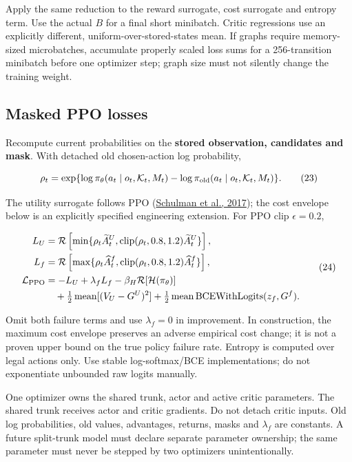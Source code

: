 \documentclass[10pt,a4paper]{article}
\begin{document}
Apply the same reduction to the reward surrogate, cost surrogate and
entropy term. Use the actual \(B\) for a final short minibatch. Critic
regressions use an explicitly different, uniform-over-stored-states
mean. If graphs require memory-sized microbatches, accumulate properly
scaled loss sums for a 256-transition minibatch before one optimizer
step; graph size must not silently change the training weight.

\hypertarget{masked-ppo-losses}{%
\subsection{Masked PPO losses}\label{masked-ppo-losses}}

Recompute current probabilities on the \textbf{stored observation,
candidates and mask}. With detached old chosen-action log probability,

\[
\rho_t=\exp\{\log\pi_\theta(a_t\mid o_t,\mathcal K_t,M_t)
-\log\pi_{\rm old}(a_t\mid o_t,\mathcal K_t,M_t)\}.
\tag{23}
\]

The utility surrogate follows PPO
(\href{https://arxiv.org/abs/1707.06347}{Schulman et al., 2017}); the
cost envelope below is an explicitly specified engineering extension.
For PPO clip \(\epsilon=0.2\),

\[
\begin{aligned}
L_U&=\mathcal R\left[\min\{\rho_t\widetilde A_t^U,
\operatorname{clip}(\rho_t,0.8,1.2)\widetilde A_t^U\}\right],\\
L_f&=\mathcal R\left[\max\{\rho_t\widehat A_t^f,
\operatorname{clip}(\rho_t,0.8,1.2)\widehat A_t^f\}\right],\\
\mathcal L_{\rm PPO}&=-L_U+\lambda_fL_f-\beta_H\mathcal R[\mathcal H(\pi_\theta)]\\
&\quad+\tfrac12\operatorname{mean}[(V_U-G^U)^2]
+\tfrac12\operatorname{mean}\operatorname{BCEWithLogits}(z_f,G^f).
\end{aligned}
\tag{24}
\]

Omit both failure terms and use \(\lambda_f=0\) in improvement. In
construction, the maximum cost envelope preserves an adverse empirical
cost change; it is not a proven upper bound on the true policy failure
rate. Entropy is computed over legal actions only. Use stable
log-softmax/BCE implementations; do not exponentiate unbounded raw
logits manually.

One optimizer owns the shared trunk, actor and active critic parameters.
The shared trunk receives actor and critic gradients. Do not detach
critic inputs. Old log probabilities, old values, advantages, returns,
masks and \(\lambda_f\) are constants. A future split-trunk model must
declare separate parameter ownership; the same parameter must never be
stepped by two optimizers unintentionally.
\end{document}
